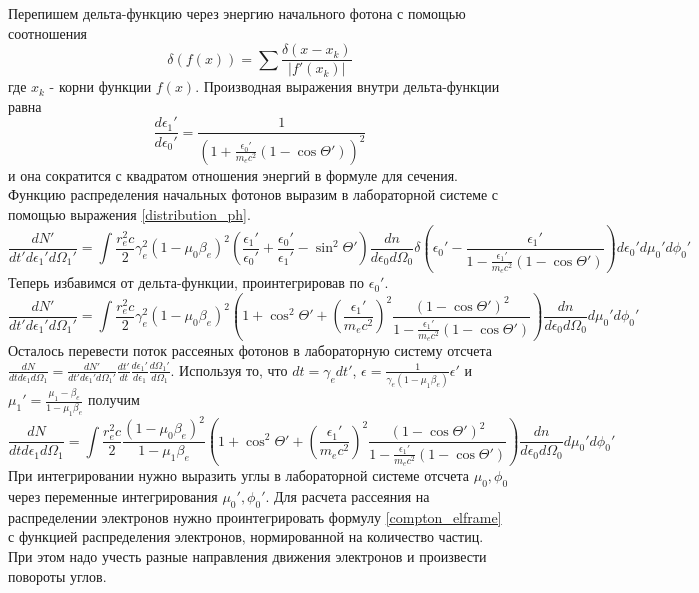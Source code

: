 Перепишем дельта-функцию через энергию начального фотона с помощью соотношения 
\begin{equation}
	\delta(f(x)) = \sum \frac{\delta(x-x_k)}{|f'(x_k)|}
\end{equation}
где $x_k$ - корни функции $f(x)$. Производная выражения внутри дельта-функции равна
\begin{equation}
	\frac{d\epsilon_1'}{d\epsilon_0'}=\frac{1}{(1+\frac{\epsilon_0'}{m_e c^2}(1 - \cos \Theta'))^2}
\end{equation}
и она сократится с квадратом отношения энергий в формуле для сечения. Функцию распределения начальных фотонов выразим в лабораторной системе с помощью выражения \ref{distribution_ph}.
\begin{equation}
	\frac{dN'}{dt'd\epsilon_1'd\Omega_1'}=\int \frac{r_e^2 c}{2} \gamma_e^2 (1 - \mu_0 \beta_e)^2 (\frac{\epsilon_1'}{\epsilon_0'}+\frac{\epsilon_0'}{\epsilon_1'}-\sin^2\Theta')\frac{dn}{d\epsilon_0 d\Omega_0} \delta(\epsilon_0' - \frac{\epsilon_1'}{1-\frac{\epsilon_1'}{m_e c^2}(1 - \cos \Theta')}) d\epsilon_0'd\mu_0' d\phi_0'
\end{equation}
Теперь избавимся от дельта-функции, проинтегрировав по $\epsilon_0'$.
\begin{equation}
	\frac{dN'}{dt'd\epsilon_1'd\Omega_1'}=\int \frac{r_e^2 c}{2} \gamma_e^2 (1 - \mu_0 \beta_e)^2 (1 + \cos^2\Theta'+(\frac{\epsilon_1'}{m_e c^2})^2\frac{(1-\cos\Theta')^2}{1-\frac{\epsilon_1'}{m_e c^2}(1 - \cos \Theta')})\frac{dn}{d\epsilon_0 d\Omega_0}d\mu_0' d\phi_0'
\end{equation}
Осталось перевести поток рассеяных фотонов в лабораторную систему отсчета $\frac{dN}{dt d\epsilon_1 d\Omega_1} = \frac{dN'}{dt' d\epsilon_1' d\Omega_1'}\frac{dt'}{dt}\frac{d\epsilon_1'}{d\epsilon_1}\frac{d\Omega_1'}{d\Omega_1}$. Используя то, что $dt = \gamma_e dt'$, $\epsilon = \frac{1}{\gamma_e(1 -\mu_1\beta_e)}\epsilon'$ и $\mu_1' = \frac{\mu_1-\beta_e}{1-\mu_1 \beta_e}$ получим
\begin{equation} \label{compton_elframe}
	\frac{dN}{dt d\epsilon_1 d\Omega_1}=\int \frac{r_e^2 c}{2} \frac{(1 - \mu_0 \beta_e)^2}{1-\mu_1\beta_e} (1 + \cos^2\Theta'+(\frac{\epsilon_1'}{m_e c^2})^2\frac{(1-\cos\Theta')^2}{1-\frac{\epsilon_1'}{m_e c^2}(1 - \cos \Theta')})\frac{dn}{d\epsilon_0 d\Omega_0}d\mu_0' d\phi_0'	
\end{equation}
При интегрировании нужно выразить углы в лабораторной системе отсчета $\mu_0, \phi_0$ через переменные интегрирования $\mu_0', \phi_0'$. Для расчета рассеяния на распределении электронов нужно проинтегрировать формулу \ref{compton_elframe} с функцией распределения электронов, нормированной на количество частиц. При этом надо учесть разные направления движения электронов и произвести повороты углов.

